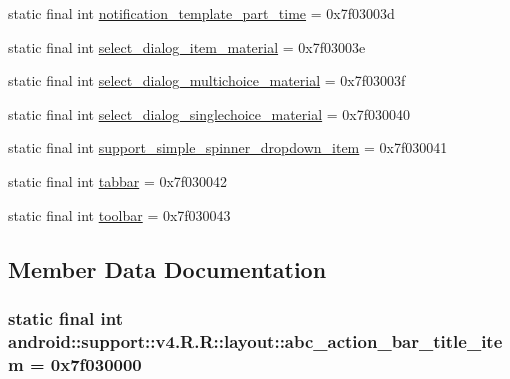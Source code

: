 \begin{CompactItemize}
\item 
static final int \hyperlink{classandroid_1_1support_1_1v4_1_1_r_1_1layout_f3daa09607b194d40f0942a102e7c579}{notification\_\-template\_\-part\_\-time} = 0x7f03003d
\item 
static final int \hyperlink{classandroid_1_1support_1_1v4_1_1_r_1_1layout_5604cdaa403de385a6d57e5dffb201a7}{select\_\-dialog\_\-item\_\-material} = 0x7f03003e
\item 
static final int \hyperlink{classandroid_1_1support_1_1v4_1_1_r_1_1layout_a91896f3a8ec3bfbfa6d162d8742170c}{select\_\-dialog\_\-multichoice\_\-material} = 0x7f03003f
\item 
static final int \hyperlink{classandroid_1_1support_1_1v4_1_1_r_1_1layout_583175dfb8eefda38808cc7fe6bcefed}{select\_\-dialog\_\-singlechoice\_\-material} = 0x7f030040
\item 
static final int \hyperlink{classandroid_1_1support_1_1v4_1_1_r_1_1layout_907cb0c27c1b3cab4b7a75eb9d04c5cd}{support\_\-simple\_\-spinner\_\-dropdown\_\-item} = 0x7f030041
\item 
static final int \hyperlink{classandroid_1_1support_1_1v4_1_1_r_1_1layout_1eaa2afdb67f80272e9a39055e2006a2}{tabbar} = 0x7f030042
\item 
static final int \hyperlink{classandroid_1_1support_1_1v4_1_1_r_1_1layout_daf41ba8ff563acdb593a5c485284069}{toolbar} = 0x7f030043
\end{CompactItemize}


\subsection{Member Data Documentation}
\hypertarget{classandroid_1_1support_1_1v4_1_1_r_1_1layout_827fbb875b82fc72d3b59f4a4fc23036}{
\subsubsection[{abc\_\-action\_\-bar\_\-title\_\-item}]{\setlength{\rightskip}{0pt plus 5cm}static final int android::support::v4.R.R::layout::abc\_\-action\_\-bar\_\-title\_\-item = 0x7f030000}}
\label{classandroid_1_1support_1_1v4_1_1_r_1_1layout_827fbb875b82fc72d3b59f4a4fc23036}


